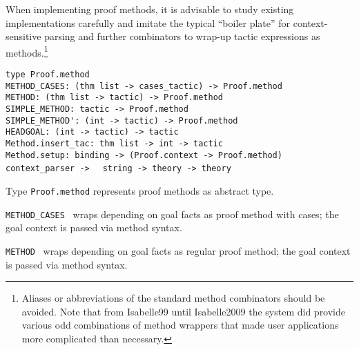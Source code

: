 \begin{isabellebody}
\begin{isamarkuptext}
  When implementing proof methods, it is advisable to study existing
  implementations carefully and imitate the typical ``boiler plate''
  for context-sensitive parsing and further combinators to wrap-up
  tactic expressions as methods.\footnote{Aliases or abbreviations of
  the standard method combinators should be avoided.  Note that from
  Isabelle99 until Isabelle2009 the system did provide various odd
  combinations of method wrappers that made user applications more
  complicated than necessary.}%
\end{isamarkuptext}%
\isamarkuptrue%
%
\isadelimmlref
%
\endisadelimmlref
%
\isatagmlref
%
\begin{isamarkuptext}%
\begin{mldecls}
  \verb|type Proof.method| \\
  \verb|METHOD_CASES: (thm list -> cases_tactic) -> Proof.method| \\
  \verb|METHOD: (thm list -> tactic) -> Proof.method| \\
  \verb|SIMPLE_METHOD: tactic -> Proof.method| \\
  \verb|SIMPLE_METHOD': (int -> tactic) -> Proof.method| \\
  \verb|HEADGOAL: (int -> tactic) -> tactic| \\
  \verb|Method.insert_tac: thm list -> int -> tactic| \\
  \verb|Method.setup: binding -> (Proof.context -> Proof.method) context_parser ->|\isasep\isanewline%
\verb|  string -> theory -> theory| \\
  \end{mldecls}

  \begin{description}

  \item Type \verb|Proof.method| represents proof methods as
  abstract type.

  \item \verb|METHOD_CASES|~ wraps
   depending on goal facts as proof method with
  cases; the goal context is passed via method syntax.

  \item \verb|METHOD|~ wraps  depending on goal facts as regular proof method; the goal
  context is passed via method syntax.


\end{description}
\end{isamarkuptext}
\end{isabellebody}
